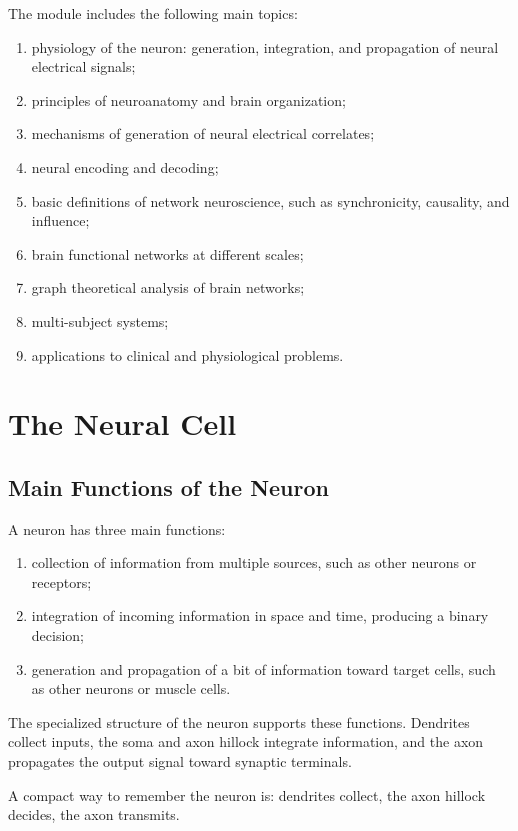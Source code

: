 The module includes the following main topics:

\begin{enumerate}[noitemsep]
    \item physiology of the neuron: generation, integration, and propagation of neural electrical signals;
    \item principles of neuroanatomy and brain organization;
    \item mechanisms of generation of neural electrical correlates;
    \item neural encoding and decoding;
    \item basic definitions of network neuroscience, such as synchronicity, causality, and influence;
    \item brain functional networks at different scales;
    \item graph theoretical analysis of brain networks;
    \item multi-subject systems;
    \item applications to clinical and physiological problems.
\end{enumerate}

\section{The Neural Cell}

\subsection{Main Functions of the Neuron}

A neuron has three main functions:

\begin{enumerate}[noitemsep]
    \item collection of information from multiple sources, such as other neurons or receptors;
    \item integration of incoming information in space and time, producing a binary decision;
    \item generation and propagation of a bit of information toward target cells, such as other neurons or muscle cells.
\end{enumerate}

The specialized structure of the neuron supports these functions. Dendrites collect inputs, the soma and axon hillock integrate information, and the axon propagates the output signal toward synaptic terminals.

\begin{authornote}
A compact way to remember the neuron is: dendrites collect, the axon hillock decides, the axon transmits.
\end{authornote}

